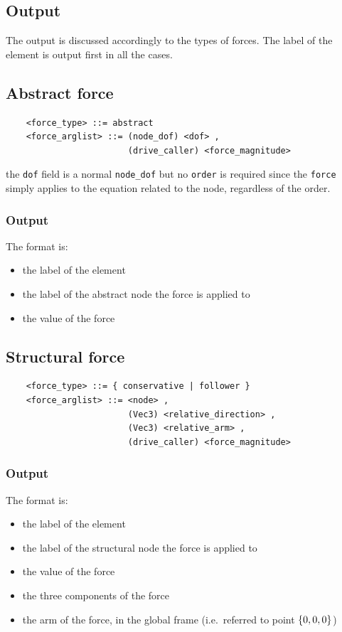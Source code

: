 \documentclass[10pt,dvips]{report}
\begin{document}
\subsection{Output}
The output is discussed accordingly to the types of forces. 
The label of the element is output first in all the cases.

\subsection{Abstract force}
\begin{verbatim}
    <force_type> ::= abstract 
    <force_arglist> ::= (node_dof) <dof> ,
                        (drive_caller) <force_magnitude>
\end{verbatim}
the {\tt dof} field is a normal {\tt node\_dof} but no {\tt order} is required
since the {\tt force} simply applies to the equation related to the node,
regardless of the order.

\subsubsection{Output}
The format is:
\begin{itemize}
    \item the label of the element
    \item the label of the abstract node the force is applied to
    \item the value of the force
\end{itemize}


\subsection{Structural force}
\begin{verbatim}
    <force_type> ::= { conservative | follower } 
    <force_arglist> ::= <node> , 
                        (Vec3) <relative_direction> ,
                        (Vec3) <relative_arm> ,
                        (drive_caller) <force_magnitude>
\end{verbatim}

\subsubsection{Output}
The format is:
\begin{itemize}
    \item the label of the element
    \item the label of the structural node the force is applied to
    \item the value of the force
    \item the three components of the force
    \item the arm of the force, in the global frame (i.e.\ referred
          to point $ \left\{ 0,0,0 \right\} $)
\end{itemize}
\end{document}
